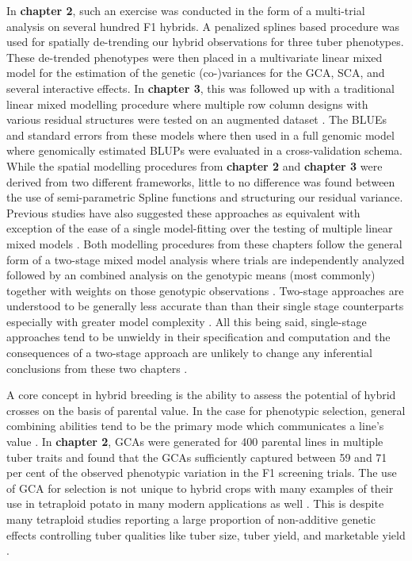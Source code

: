 \documentclass[
]{article}
\begin{document}
In \textbf{chapter 2}, such an exercise was conducted in the form of a
multi-trial analysis on several hundred F1 hybrids. A penalized splines
based procedure was used for spatially de-trending our hybrid
observations for three tuber phenotypes. These de-trended phenotypes
were then placed in a multivariate linear mixed model for the estimation
of the genetic (co-)variances for the GCA, SCA, and several interactive
effects. In \textbf{chapter 3}, this was followed up with a traditional
linear mixed modelling procedure where multiple row column designs with
various residual structures were tested on an augmented dataset
\autocite{Gilmour1997}. The BLUEs and standard errors from these models
where then used in a full genomic model where genomically estimated
BLUPs were evaluated in a cross-validation schema. While the spatial
modelling procedures from \textbf{chapter 2} and \textbf{chapter 3} were
derived from two different frameworks, little to no difference was found
between the use of semi-parametric Spline functions and structuring our
residual variance. Previous studies have also suggested these approaches
as equivalent with exception of the ease of a single model-fitting over
the testing of multiple linear mixed models \autocite{Velazco2017}. Both
modelling procedures from these chapters follow the general form of a
two-stage mixed model analysis where trials are independently analyzed
followed by an combined analysis on the genotypic means (most commonly)
together with weights on those genotypic observations
\autocite{Piepho2012}. Two-stage approaches are understood to be
generally less accurate than than their single stage counterparts
especially with greater model complexity \autocite{Gogel2018}. All this
being said, single-stage approaches tend to be unwieldy in their
specification and computation and the consequences of a two-stage
approach are unlikely to change any inferential conclusions from these
two chapters \autocite{Damesa2017}.

A core concept in hybrid breeding is the ability to assess the potential
of hybrid crosses on the basis of parental value. In the case for
phenotypic selection, general combining abilities tend to be the primary
mode which communicates a line's value \autocite{Bertan2007}. In
\textbf{chapter 2}, GCAs were generated for 400 parental lines in
multiple tuber traits and found that the GCAs sufficiently captured
between 59 and 71 per cent of the observed phenotypic variation in the
F1 screening trials. The use of GCA for selection is not unique to
hybrid crops with many examples of their use in tetraploid potato in
many modern applications as well \autocite{Neele1991,Bradshaw2003}. This
is despite many tetraploid studies reporting a large proportion of
non-additive genetic effects controlling tuber qualities like tuber
size, tuber yield, and marketable yield
\autocite{Plaisted1962,Tai1976,Killick1977}.
\end{document}
